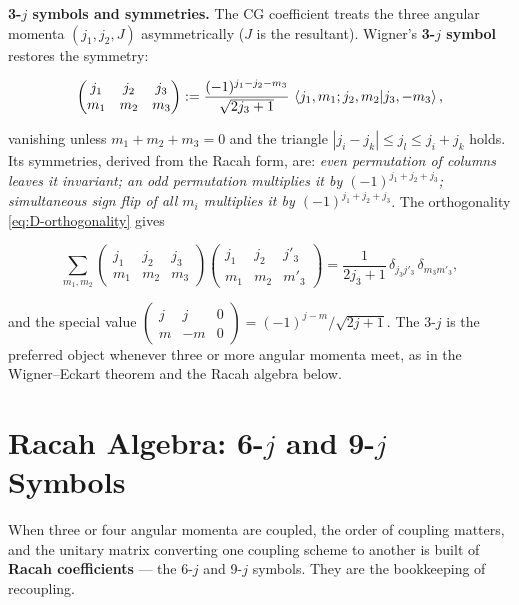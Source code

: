 \medskip\noindent\textbf{3-$j$ symbols and symmetries.} The CG coefficient treats the three angular momenta $(j_{1},j_{2},J)$ asymmetrically ($J$ is the resultant). Wigner's \textbf{3-$j$ symbol} restores the symmetry:
\begin{linenomath}
\begin{equation*}
\begin{pmatrix}j_{1}&j_{2}&j_{3}\\ m_{1}&m_{2}&m_{3}\end{pmatrix}
:=\frac{(-1)^{j_{1}-j_{2}-m_{3}}}{\sqrt{2j_{3}+1}}\,\braket{j_{1},m_{1};j_{2},m_{2}|j_{3},-m_{3}},
\end{equation*}
\end{linenomath}
vanishing unless $m_{1}+m_{2}+m_{3}=0$ and the triangle $|j_{i}-j_{k}|\le j_{l}\le j_{i}+j_{k}$ holds. Its symmetries, derived from the Racah form, are: \emph{even permutation of columns leaves it invariant; an odd permutation multiplies it by $(-1)^{j_{1}+j_{2}+j_{3}}$; simultaneous sign flip of all $m_{i}$ multiplies it by $(-1)^{j_{1}+j_{2}+j_{3}}$}. The orthogonality \eqref{eq:D-orthogonality} gives
\begin{linenomath}
\begin{equation*}
\sum_{m_{1},m_{2}}\begin{pmatrix}j_{1}&j_{2}&j_{3}\\ m_{1}&m_{2}&m_{3}\end{pmatrix}\!\begin{pmatrix}j_{1}&j_{2}&j'_{3}\\ m_{1}&m_{2}&m'_{3}\end{pmatrix}=\frac{1}{2j_{3}+1}\,\delta_{j_{3}j'_{3}}\,\delta_{m_{3}m'_{3}},
\end{equation*}
\end{linenomath}
and the special value $\begin{pmatrix}j&j&0\\m&-m&0\end{pmatrix}=(-1)^{j-m}/\sqrt{2j+1}$. The 3-$j$ is the preferred object whenever three or more angular momenta meet, as in the Wigner--Eckart theorem and the Racah algebra below.

\section{Racah Algebra: 6-$j$ and 9-$j$ Symbols}
\label{sec:appendix-racah}

When three or four angular momenta are coupled, the order of coupling matters, and the unitary matrix converting one coupling scheme to another is built of \textbf{Racah coefficients} --- the 6-$j$ and 9-$j$ symbols. They are the bookkeeping of recoupling.

